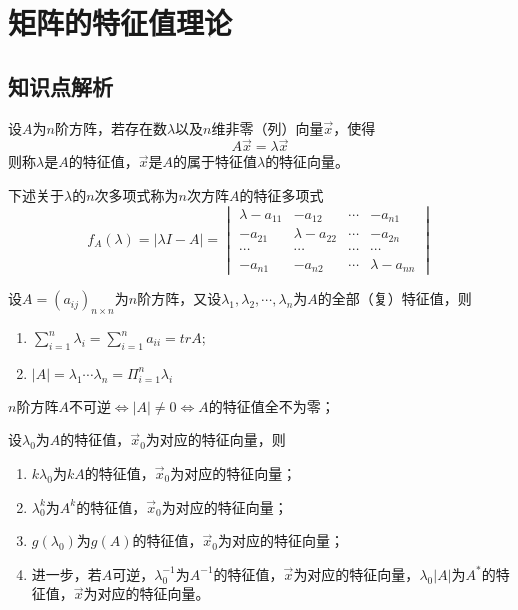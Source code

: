 \chapter{矩阵的特征值理论}

\section{知识点解析}

\begin{Def}
设$A$为$n$阶方阵，若存在数$\lambda$以及$n$维非零（列）向量$\vec{x}$，使得
$$
A\vec{x}=\lambda\vec{x}
$$
则称$\lambda$是$A$的特征值，$\vec{x}$是$A$的属于特征值$\lambda$的特征向量。
\end{Def}

\begin{Def}
下述关于$\lambda$的$n$次多项式称为$n$次方阵$A$的特征多项式
\begin{equation*}
f_A(\lambda)=|\lambda I-A|
=\begin{vmatrix}\lambda-a_{11}&-a_{12}&\cdots&-a_{n1}\\
-a_{21}&\lambda-a_{22}&\cdots&-a_{2n}\\
\cdots&\cdots&\cdots&\cdots\\
-a_{n1}&-a_{n2}&\cdots&\lambda-a_{nn}\end{vmatrix}
\end{equation*}
\end{Def}

\begin{thm}
设$A=(a_{ij})_{n\times n}$为$n$阶方阵，又设$\lambda_1,\lambda_2,\cdots,\lambda_n$为$A$的全部（复）特征值，则
\begin{enumerate}
  \item $\sum_{i=1}^n\lambda_i=\sum_{i=1}^na_{ii}=trA$;
  \item $|A|=\lambda_1\cdots\lambda_n=\Pi_{i=1}^n\lambda_i$
\end{enumerate}
\end{thm}

\begin{cor}
$n$阶方阵$A$不可逆$\Leftrightarrow$$|A|\neq 0$$\Leftrightarrow$$A$的特征值全不为零；
\end{cor}

\begin{cor}
设$\lambda_0$为$A$的特征值，$\vec{x}_0$为对应的特征向量，则
\begin{enumerate}
  \item $k\lambda_0$为$kA$的特征值，$\vec{x}_0$为对应的特征向量；
  \item $\lambda_0^k$为$A^k$的特征值，$\vec{x}_0$为对应的特征向量；
  \item $g(\lambda_0)$为$g(A)$的特征值，$\vec{x}_0$为对应的特征向量；
  \item 进一步，若$A$可逆，$\lambda^{-1}_0$为$A^{-1}$的特征值，$\vec{x}$为对应的特征向量，$\lambda_0|A|$为$A^{*}$的特征值，$\vec{x}$为对应的特征向量。
\end{enumerate}
\end{cor}

